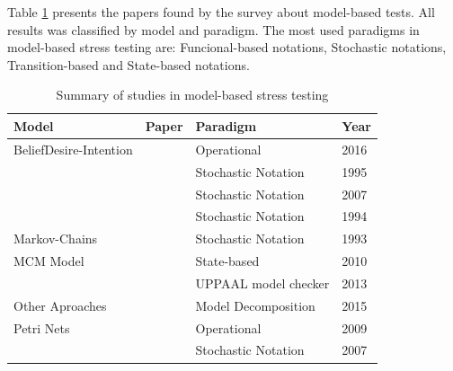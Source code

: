 \documentclass[espaco=umemeio,chapter=TITLE,twoside,openright]{abnt}
\begin{document}
Table \ref{modelsummary} presents the papers found by the survey about model-based tests. All results was classified by model and paradigm. The most used paradigms in model-based stress testing are:  Funcional-based notations, Stochastic notations, Transition-based and State-based notations. 

\begin{table}[h]
\centering
\caption{Summary of studies in model-based stress testing}
\label{modelsummary}
\begin{tabular}{|l|l|l|l|}
\hline
\rowcolor[HTML]{C0C0C0}
\textbf{Model}                          & \textbf{Paper}          & \textbf{Paradigm}    & \textbf{Year} \\ \hline
BeliefDesire-Intention                  & \cite{Araiza-Illan2016} & Operational          & 2016          \\ \hline
                                        & \cite{Avritzer1995b}    & Stochastic Notation         & 1995          \\ \cline{2-4}
                                        & \cite{Barros2007}       & Stochastic Notation        & 2007          \\ \cline{2-4}
                                        & \cite{Avritzer1994}     & Stochastic Notation        & 1994          \\ \cline{2-4}
\multirow{-4}{*}{Markov-Chains}         & \cite{Avritzer1993}     & Stochastic Notation         & 1993          \\ \hline
MCM Model                               & \begin{minipage}{0.4\textwidth}\cite{Wieczorek2010}\end{minipage}    & State-based          & 2010          \\ \hline
                                        & \begin{minipage}{0.4\textwidth}\cite{Enoiu2013}\end{minipage}        & UPPAAL model checker & 2013          \\ \cline{2-4}
\multirow{-2}{*}{Other Aproaches}       & \begin{minipage}{0.4\textwidth}\cite{Arcaini2015}\end{minipage}      & Model Decomposition  & 2015          \\ \hline
Petri Nets                              & \cite{Buchs2009}        & Operational          & 2009          \\ \hline
                                        & \cite{Cai2007}          & Stochastic Notation    & 2007          \\ \cline{2-4}
                                        

\end{tabular}
\end{table}
\end{document}
